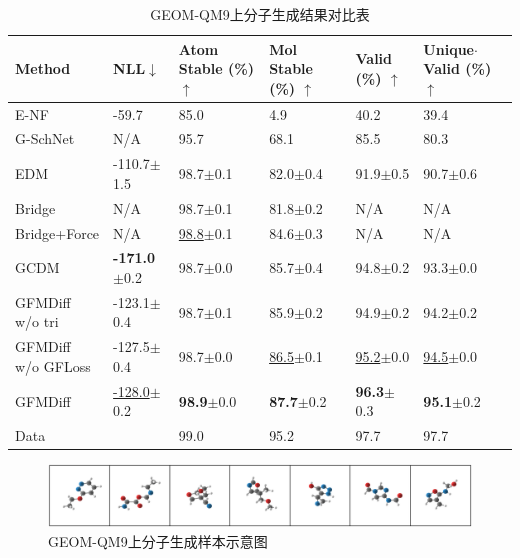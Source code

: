 \begin{table}[h]
    \centering
    \caption{GEOM-QM9上分子生成结果对比表}
    \label{tab:exp_qm9}
    \begin{tabular}{llllll}
    \hline
    Method & NLL$\downarrow$ & \makecell[l]{Atom\\Stable\\(\%) $\uparrow$} & \makecell[l]{Mol\\Stable\\(\%) $\uparrow$} & \makecell[l]{Valid\\(\%) $\uparrow$} & \makecell[l]{Unique$\cdot$Valid\\(\%) $\uparrow$} \\
    \hline
    E-NF & -59.7 & 85.0 & 4.9 & 40.2 & 39.4 \\
    G-SchNet & N/A & 95.7 & 68.1 & 85.5 & 80.3 \\
    EDM & -110.7$\pm$1.5 & 98.7$\pm$0.1 & 82.0$\pm$0.4 & 91.9$\pm$0.5 & 90.7$\pm$0.6 \\
    Bridge & N/A & 98.7$\pm$0.1 & 81.8$\pm$0.2 & N/A & N/A \\
    Bridge+Force & N/A & \underline{98.8}$\pm$0.1 & 84.6$\pm$0.3 & N/A & N/A \\
    GCDM & \textbf{-171.0}$\pm$0.2 & 98.7$\pm$0.0 & 85.7$\pm$0.4 & 94.8$\pm$0.2 & 93.3$\pm$0.0 \\
    \hline
    \makecell[l]{GFMDiff\\w/o tri} & -123.1$\pm$0.4 & 98.7$\pm$0.1 & 85.9$\pm$0.2 & 94.9$\pm$0.2 & 94.2$\pm$0.2 \\
    \makecell[l]{GFMDiff\\w/o GFLoss} & -127.5$\pm$0.4 & 98.7$\pm$0.0 & \underline{86.5}$\pm$0.1 & \underline{95.2}$\pm$0.0 & \underline{94.5}$\pm$0.0 \\
    GFMDiff & \underline{-128.0}$\pm$0.2 & \textbf{98.9}$\pm$0.0 & \textbf{87.7}$\pm$0.2 & \textbf{96.3}$\pm$0.3 & \textbf{95.1}$\pm$0.2 \\
    \hline
    Data &  & 99.0 & 95.2 & 97.7 & 97.7 \\
    \hline
    \end{tabular}
\end{table}
\begin{figure}[h]
    \centering
    \includegraphics[width=\linewidth]{figures/samples_qm9.png}
    \caption{GEOM-QM9上分子生成样本示意图}
    \label{fig:samples_qm9}
\end{figure}

